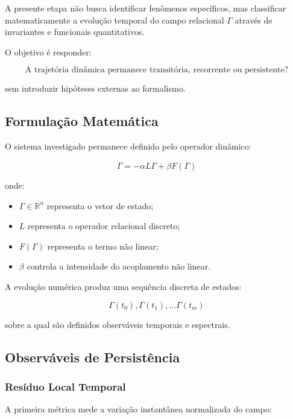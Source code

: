 \documentclass[11pt,a4paper]{article}
\begin{document}
A presente etapa não busca identificar fenômenos específicos, mas
classificar matematicamente a evolução temporal do campo relacional
$\Gamma$ através de invariantes e funcionais quantitativos.

O objetivo é responder:

\[
\text{A trajetória dinâmica permanece transitória, recorrente ou persistente?}
\]

sem introduzir hipóteses externas ao formalismo.


\subsection{Formulação Matemática}

O sistema investigado permanece definido pelo operador dinâmico:

\[
\ddot{\Gamma}
=
-\alpha L\Gamma
+
\beta F(\Gamma)
\]

onde:

\begin{itemize}
    \item $\Gamma \in \mathbb{R}^{n}$ representa o vetor de estado;
    \item $L$ representa o operador relacional discreto;
    \item $F(\Gamma)$ representa o termo não linear;
    \item $\beta$ controla a intensidade do acoplamento não linear.
\end{itemize}

A evolução numérica produz uma sequência discreta de estados:

\[
\Gamma(t_0),
\Gamma(t_1),
...
\Gamma(t_m)
\]

sobre a qual são definidos observáveis temporais e espectrais.


\subsection{Observáveis de Persistência}

\subsubsection{Resíduo Local Temporal}

A primeira métrica mede a variação instantânea normalizada do campo:
\end{document}
